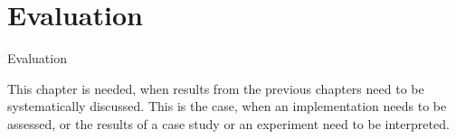 \chapter{Evaluation}
\label{Evaluation}

Evaluation

This chapter is needed, when results from the previous chapters need to be systematically discussed. This is the case, when an implementation needs to be assessed, or the results of a case study or an experiment need to be interpreted.


